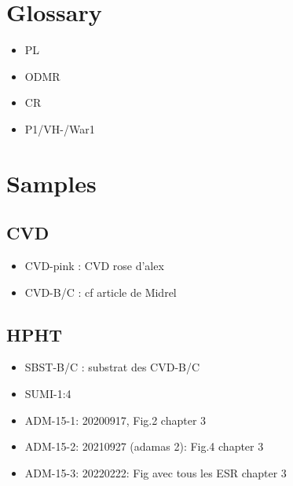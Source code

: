 \documentclass[a4paper]{article}
\begin{document}
\section{Glossary}
\begin{itemize}
\item PL
\item ODMR
\item CR
\item P1/VH-/War1
\end{itemize}
\section{Samples}
\subsection{CVD}
\begin{itemize}
\item CVD-pink : CVD rose d'alex
\item CVD-B/C : cf article de Midrel
\end{itemize}
\subsection{HPHT}
\begin{itemize}
\item SBST-B/C : substrat des CVD-B/C
\item SUMI-1:4
\item ADM-15-1: 20200917, Fig.2 chapter 3
\item ADM-15-2: 20210927 (adamas 2): Fig.4 chapter 3
\item ADM-15-3: 20220222: Fig avec tous les ESR chapter 3
\end{itemize}
\end{document}
